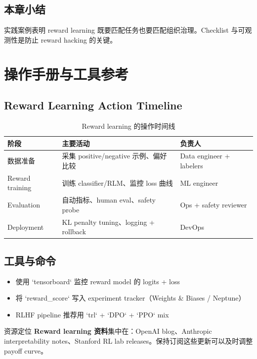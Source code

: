 \documentclass[a4paper]{article}
\begin{document}
\subsection{本章小结}

实践案例表明 reward learning 既要匹配任务也要匹配组织治理。Checklist 与可观测性是防止 reward hacking 的关键。

\section{操作手册与工具参考}

\subsection{Reward Learning Action Timeline}

\begin{table}[H]
\centering
\begin{tabular}{p{} p{} p{}}
\toprule
阶段 & 主要活动 & 负责人 \\
\midrule
数据准备 & 采集 positive/negative 示例、偏好比较 & Data engineer + labelers \\
Reward training & 训练 classifier/RLM、监控 loss 曲线 & ML engineer \\
Evaluation & 自动指标、human eval、safety probe & Ops + safety reviewer \\
Deployment & KL penalty tuning、logging + rollback & DevOps \\
\bottomrule
\end{tabular}
\caption{Reward learning 的操作时间线}
\end{table}

\subsection{工具与命令}

\begin{itemize}
    \item 使用 `tensorboard` 监控 reward model 的 logits + loss
    \item 将 `reward_score` 写入 experiment tracker（Weights & Biases / Neptune）
    \item RLHF pipeline 推荐用 `trl` + `DPO` + `PPO` mix
\end{itemize}

\begin{knowledgebox}{资源定位}
\textbf{Reward learning 资料}集中在：OpenAI blog、Anthropic interpretability notes、Stanford RL lab releases。保持订阅这些更新可以及时调整 payoff curve。
\end{knowledgebox}
\end{document}
